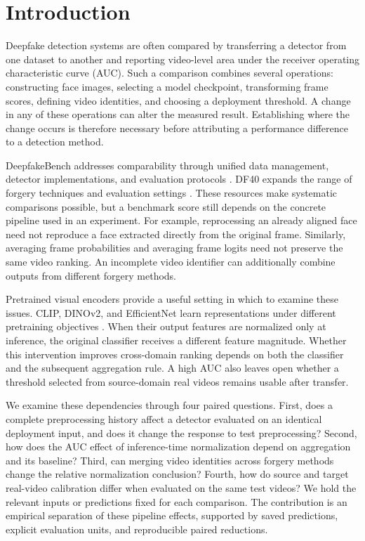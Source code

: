 \documentclass{ieeeaccess}
\begin{document}
\section{Introduction}\label{introduction}

Deepfake detection systems are often compared by transferring a detector
from one dataset to another and reporting video-level area under the
receiver operating characteristic curve (AUC). Such a comparison
combines several operations: constructing face images, selecting a model
checkpoint, transforming frame scores, defining video identities, and
choosing a deployment threshold. A change in any of these operations can
alter the measured result. Establishing where the change occurs is
therefore necessary before attributing a performance difference to a
detection method.

DeepfakeBench addresses comparability through unified data management,
detector implementations, and evaluation protocols
\citep{deepfakebench}. DF40 expands the range of forgery techniques and
evaluation settings \citep{df40}. These resources make systematic
comparisons possible, but a benchmark score still depends on the
concrete pipeline used in an experiment. For example, reprocessing an
already aligned face need not reproduce a face extracted directly from
the original frame. Similarly, averaging frame probabilities and
averaging frame logits need not preserve the same video ranking. An
incomplete video identifier can additionally combine outputs from
different forgery methods.

Pretrained visual encoders provide a useful setting in which to examine
these issues. CLIP, DINOv2, and EfficientNet learn representations under
different pretraining objectives \citep{clip, dinov2, efficientnet}.
When their output features are normalized only at inference, the
original classifier receives a different feature magnitude. Whether this
intervention improves cross-domain ranking depends on both the
classifier and the subsequent aggregation rule. A high AUC also leaves
open whether a threshold selected from source-domain real videos remains
usable after transfer.

We examine these dependencies through four paired questions. First, does
a complete preprocessing history affect a detector evaluated on an
identical deployment input, and does it change the response to test
preprocessing? Second, how does the AUC effect of inference-time
normalization depend on aggregation and its baseline? Third, can merging
video identities across forgery methods change the relative
normalization conclusion? Fourth, how do source and target real-video
calibration differ when evaluated on the same test videos? We hold the
relevant inputs or predictions fixed for each comparison. The
contribution is an empirical separation of these pipeline effects,
supported by saved predictions, explicit evaluation units, and
reproducible paired reductions.
\end{document}
